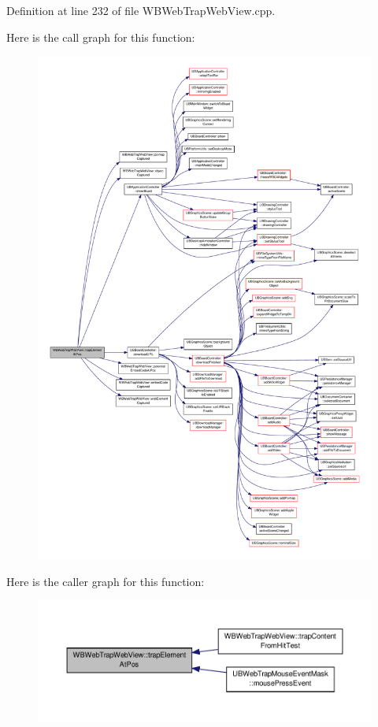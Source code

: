 Definition at line 232 of file W\-B\-Web\-Trap\-Web\-View.\-cpp.



Here is the call graph for this function\-:
\nopagebreak
\begin{figure}[H]
\begin{center}
\leavevmode
\includegraphics[width=350pt]{db/d78/class_w_b_web_trap_web_view_afdbfd6aac50cad5ac07a465baa7be0b6_cgraph}
\end{center}
\end{figure}




Here is the caller graph for this function\-:
\nopagebreak
\begin{figure}[H]
\begin{center}
\leavevmode
\includegraphics[width=350pt]{db/d78/class_w_b_web_trap_web_view_afdbfd6aac50cad5ac07a465baa7be0b6_icgraph}
\end{center}
\end{figure}


